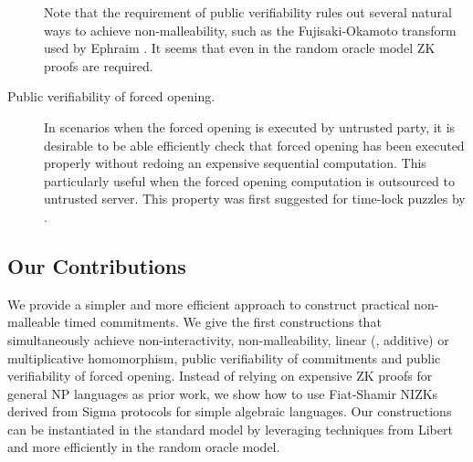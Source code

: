 \begin{description}
	Note that the requirement of public verifiability rules out several natural ways to achieve non-malleability, such as the Fujisaki-Okamoto transform \cite{C:FujOka99,JC:FujOka13} used by Ephraim \etal \cite{EPRINT:EFKP20a}. It seems that even in the random oracle model ZK proofs are required.
	\item[Public verifiability of forced opening.] In scenarios when the forced opening is executed by untrusted party, it is desirable to be able efficiently check that forced opening has been executed properly without redoing an expensive sequential computation. This particularly useful when the forced opening computation is outsourced to untrusted server. This property was first suggested for time-lock puzzles by \cite{EPRINT:EFKP20a}. 
\end{description}









\subsection{Our Contributions}

We provide a simpler and more efficient approach to construct practical non-malleable timed commitments. We give the first constructions that simultaneously achieve non-interactivity, non-malleability, linear (\ie, additive) or multiplicative homomorphism, public verifiability of commitments and public verifiability of forced opening. 
Instead of relying on expensive ZK proofs for general NP languages as prior work, we show how to use Fiat-Shamir \cite{C:FiaSha86} NIZKs derived from Sigma protocols for simple algebraic languages. Our constructions can be instantiated in the standard model by leveraging techniques from Libert \etal \cite{Libert2021OneShotFN} and more efficiently in the random oracle model.

